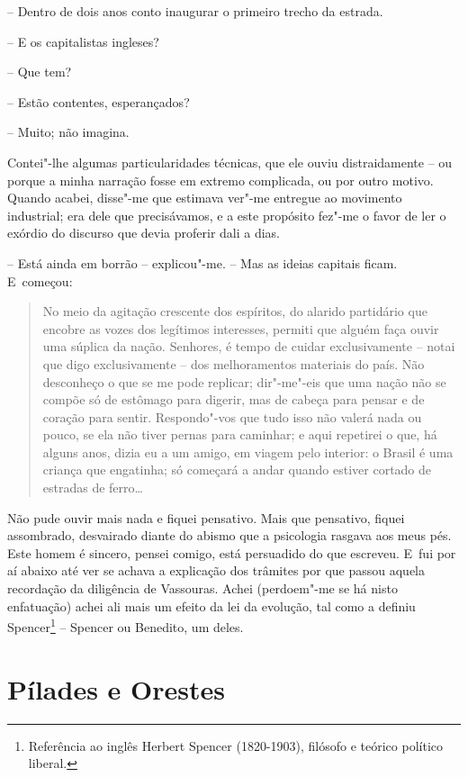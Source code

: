 -- Dentro de dois anos conto inaugurar o primeiro trecho da estrada.

-- E os capitalistas ingleses?

-- Que tem?

-- Estão contentes, esperançados?

-- Muito; não imagina.

Contei"-lhe algumas particularidades técnicas, que ele ouviu
distraidamente -- ou porque a minha narração fosse em extremo
complicada, ou por outro motivo. Quando acabei, disse"-me que estimava
ver"-me entregue ao movimento industrial; era dele que precisávamos, e a
este propósito fez"-me o favor de ler o exórdio do discurso que devia
proferir dali a dias.

-- Está ainda em borrão -- explicou"-me. -- Mas as ideias capitais ficam.
E~começou:

\begin{quote}
No meio da agitação crescente dos espíritos, do alarido partidário que
encobre as vozes dos legítimos interesses, permiti que alguém faça ouvir
uma súplica da nação. Senhores, é tempo de cuidar exclusivamente --
notai que digo exclusivamente -- dos melhoramentos materiais do país.
Não desconheço o que se me pode replicar; dir"-me"-eis que uma nação não
se compõe só de estômago para digerir, mas de cabeça para pensar e de
coração para sentir. Respondo"-vos que tudo isso não valerá nada ou
pouco, se ela não tiver pernas para caminhar; e aqui repetirei o que, há
alguns anos, dizia eu a um amigo, em viagem pelo interior: o Brasil é
uma criança que engatinha; só começará a andar quando estiver cortado de
estradas de ferro\ldots{}
\end{quote}

Não pude ouvir mais nada e fiquei pensativo. Mais que pensativo, fiquei
assombrado, desvairado diante do abismo que a psicologia rasgava aos
meus pés. Este homem é sincero, pensei comigo, está persuadido do que
escreveu. E~fui por aí abaixo até ver se achava a explicação dos
trâmites por que passou aquela recordação da diligência de Vassouras.
Achei (perdoem"-me se há nisto enfatuação) achei ali mais um efeito da
lei da evolução, tal como a definiu Spencer\footnote{Referência ao
  inglês Herbert Spencer (1820-1903), filósofo e teórico político
  liberal.} -- Spencer ou Benedito, um deles.

\chapter{Pílades e Orestes}

